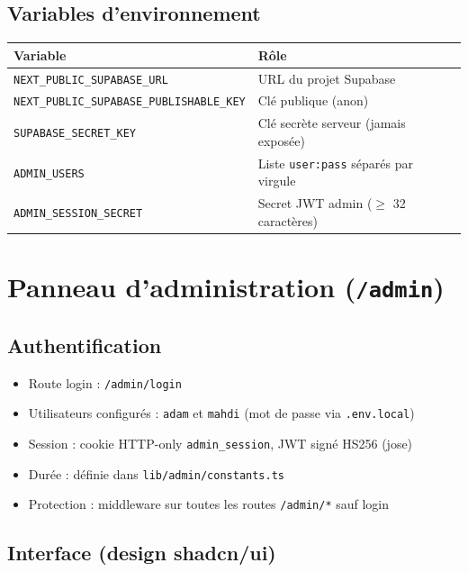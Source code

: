 \documentclass[11pt,a4paper]{report}
\begin{document}
\section{Variables d'environnement}

\begin{table}[h]
\centering
\small
\begin{tabular}{@{}lp{8cm}@{}}
\toprule
\textbf{Variable} & \textbf{Rôle} \\
\midrule
\texttt{NEXT\_PUBLIC\_SUPABASE\_URL} & URL du projet Supabase \\
\texttt{NEXT\_PUBLIC\_SUPABASE\_PUBLISHABLE\_KEY} & Clé publique (anon) \\
\texttt{SUPABASE\_SECRET\_KEY} & Clé secrète serveur (jamais exposée) \\
\texttt{ADMIN\_USERS} & Liste \texttt{user:pass} séparés par virgule \\
\texttt{ADMIN\_SESSION\_SECRET} & Secret JWT admin ($\geq$ 32 caractères) \\
\bottomrule
\end{tabular}
\end{table}

\chapter{Panneau d'administration (\texttt{/admin})}

\section{Authentification}

\begin{itemize}[leftmargin=*]
  \item Route login : \texttt{/admin/login}
  \item Utilisateurs configurés : \texttt{adam} et \texttt{mahdi} (mot de passe via \texttt{.env.local})
  \item Session : cookie HTTP-only \texttt{admin\_session}, JWT signé HS256 (jose)
  \item Durée : définie dans \texttt{lib/admin/constants.ts}
  \item Protection : middleware sur toutes les routes \texttt{/admin/*} sauf login
\end{itemize}

\section{Interface (design shadcn/ui)}
\end{document}
